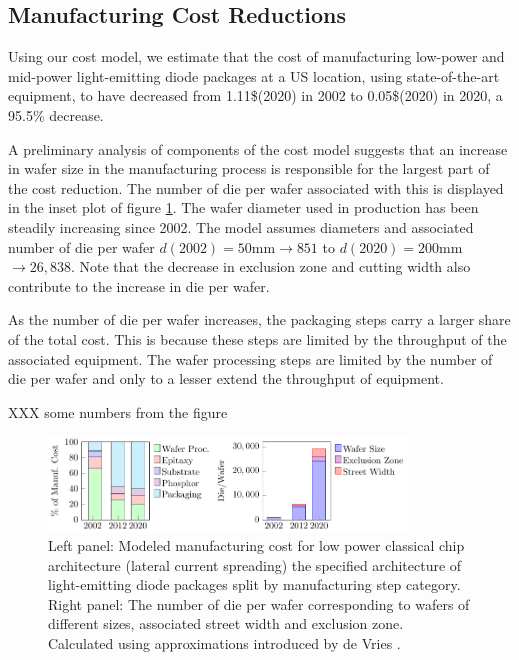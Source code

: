 \documentclass[a4paper,nocompress]{spie}  %
\begin{document}
\subsection{Manufacturing Cost Reductions}

    Using our cost model, we estimate that the cost of manufacturing low-power and mid-power light-emitting diode packages at a US location, using state-of-the-art equipment, to have decreased from 1.11\$(2020) in 2002 to 0.05\$(2020) in 2020, a 95.5\% decrease. 
    
    A preliminary analysis of components of the cost model suggests that an increase in wafer size in the manufacturing process is responsible for the largest part of the cost reduction. The number of die per wafer associated with this is displayed in the inset plot of figure \ref{fig:cost}. The wafer diameter used in production has been steadily increasing since 2002. The model assumes diameters and associated number of die per wafer  $d(2002)=50$mm$\rightarrow851$ to $d(2020)=200$mm$\rightarrow26,838$. Note that the decrease in exclusion zone and cutting width also contribute to the increase in die per wafer.
    
    As the number of die per wafer increases, the packaging steps carry a larger share of the total cost. This is because these steps are limited by the throughput of the associated equipment. The wafer processing steps are limited by the number of die per wafer and only to a lesser extend the throughput of equipment.
    
    XXX some numbers from the figure

\begin{figure} [ht]
    \begin{center}
        \includegraphics[width=0.85\textwidth]{SPIE/article/costmodel_calibration.pdf}
    \end{center}
    \caption{Left panel: Modeled manufacturing cost for low power classical chip architecture (lateral current spreading) the specified architecture of light-emitting diode packages split by manufacturing step category. Right panel: The number of die per wafer corresponding to wafers of different sizes, associated street width and exclusion zone. Calculated using approximations introduced by de Vries \cite{deVries2005}.}
    \label{fig:cost}
\end{figure}
\end{document}
